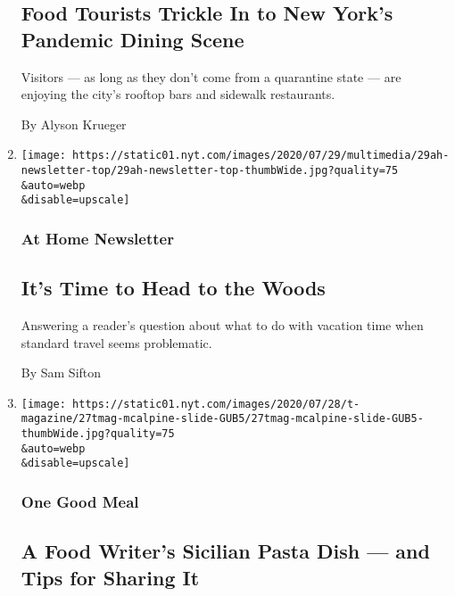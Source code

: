 \begin{enumerate}
  \hypertarget{food-tourists-trickle-in-to-new-yorks-pandemic-dining-scene}{%
  \subsection{Food Tourists Trickle In to New York's Pandemic Dining
  Scene}\label{food-tourists-trickle-in-to-new-yorks-pandemic-dining-scene}}

  Visitors --- as long as they don't come from a quarantine state ---
  are enjoying the city's rooftop bars and sidewalk restaurants.

  By Alyson Krueger
\item
  \href{/2020/07/29/at-home/newsletter.html}{}

  \texttt{[image: https://static01.nyt.com/images/2020/07/29/multimedia/29ah-newsletter-top/29ah-newsletter-top-thumbWide.jpg?quality=75\\\&auto=webp\\\&disable=upscale]}

  \hypertarget{at-home-newsletter-1}{%
  \subsubsection{At Home Newsletter}\label{at-home-newsletter-1}}

  \hypertarget{its-time-to-head-to-the-woods}{%
  \subsection{It's Time to Head to the
  Woods}\label{its-time-to-head-to-the-woods}}

  Answering a reader's question about what to do with vacation time when
  standard travel seems problematic.

  By Sam Sifton
\item
  \href{/2020/07/29/t-magazine/skye-mcalpine-pasta-cooking.html}{}

  \texttt{[image: https://static01.nyt.com/images/2020/07/28/t-magazine/27tmag-mcalpine-slide-GUB5/27tmag-mcalpine-slide-GUB5-thumbWide.jpg?quality=75\\\&auto=webp\\\&disable=upscale]}

  \hypertarget{one-good-meal}{%
  \subsubsection{One Good Meal}\label{one-good-meal}}

  \hypertarget{a-food-writers-sicilian-pasta-dish--and-tips-for-sharing-it}{%
  \subsection{A Food Writer's Sicilian Pasta Dish --- and Tips for
  Sharing
  It}\label{a-food-writers-sicilian-pasta-dish--and-tips-for-sharing-it}}


\end{enumerate}
